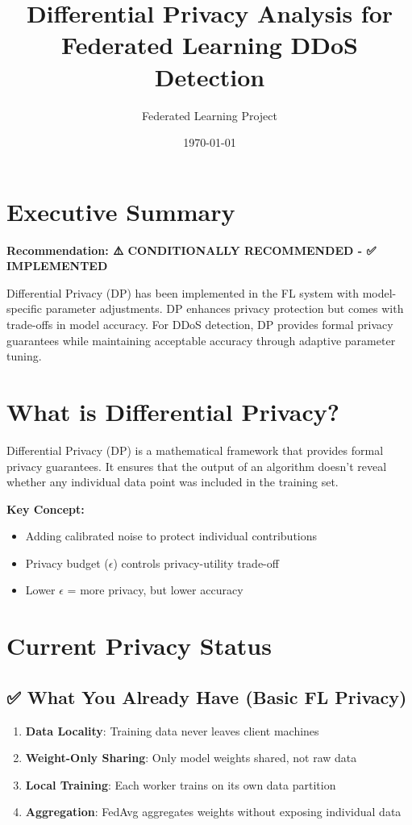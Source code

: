 \documentclass[12pt,a4paper]{article}
\title{Differential Privacy Analysis for Federated Learning DDoS Detection}
\author{Federated Learning Project}
\date{\today}
\begin{document}
\maketitle

\section{Executive Summary}

\textbf{Recommendation: ⚠️ CONDITIONALLY RECOMMENDED - ✅ IMPLEMENTED}

Differential Privacy (DP) has been implemented in the FL system with model-specific parameter adjustments. DP enhances privacy protection but comes with trade-offs in model accuracy. For DDoS detection, DP provides formal privacy guarantees while maintaining acceptable accuracy through adaptive parameter tuning.

\section{What is Differential Privacy?}

Differential Privacy (DP) is a mathematical framework that provides formal privacy guarantees. It ensures that the output of an algorithm doesn't reveal whether any individual data point was included in the training set.

\textbf{Key Concept:}
\begin{itemize}
    \item Adding calibrated noise to protect individual contributions
    \item Privacy budget ($\epsilon$) controls privacy-utility trade-off
    \item Lower $\epsilon$ = more privacy, but lower accuracy
\end{itemize}

\section{Current Privacy Status}

\subsection{✅ What You Already Have (Basic FL Privacy)}

\begin{enumerate}
    \item \textbf{Data Locality}: Training data never leaves client machines
    \item \textbf{Weight-Only Sharing}: Only model weights shared, not raw data
    \item \textbf{Local Training}: Each worker trains on its own data partition
    \item \textbf{Aggregation}: FedAvg aggregates weights without exposing individual data
\end{enumerate}
\end{document}
